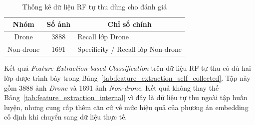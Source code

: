 \documentclass[../DoAn.tex]{subfiles}
\begin{document}
\begin{table}[H]
    \centering

    \renewcommand{\arraystretch}{1.3}
    \small
    \setlength{\tabcolsep}{4pt}
    \begin{tabular}{|c|c|p{}|}
        \hline
        \textbf{Nhóm} & \textbf{Số ảnh} & \multicolumn{1}{c|}{\textbf{Chỉ số chính}} \\ \hline
        Drone & 3888 & Recall lớp Drone \\ \hline
        Non-drone & 1691 & Specificity / Recall lớp Non-drone \\ \hline
    \end{tabular}
    \caption{Thống kê dữ liệu RF tự thu dùng cho đánh giá}
    \label{tab:self_collected_eval_statistics}
\end{table}

Kết quả \textit{Feature Extraction-based Classification} trên dữ liệu RF tự thu có đủ hai lớp được trình bày trong Bảng~\ref{tab:feature_extraction_self_collected}. Tập này gồm 3888 ảnh \textit{Drone} và 1691 ảnh \textit{Non-drone}. Kết quả không thay thế Bảng~\ref{tab:feature_extraction_internal} vì đây là dữ liệu tự thu ngoài tập huấn luyện, nhưng cung cấp thêm căn cứ về mức hiệu quả của phương án embedding cố định khi chuyển sang dữ liệu thực tế.

\begin{table}[H]
    \centering
    \renewcommand{\arraystretch}{1.3}
    \scriptsize
    \setlength{\tabcolsep}{3pt}
    \caption{Kết quả \textit{Feature Extraction-based Classification} trên dữ liệu RF tự thu}
    \label{tab:feature_extraction_self_collected}
\end{table}
\end{document}
